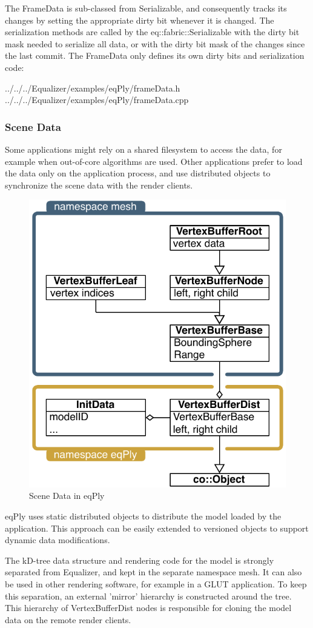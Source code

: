 \documentclass[10pt,a4]{scrartcl}
\begin{document}
The \textsf{FrameData} is sub-classed from \textsf{Serializable}, and
consequently tracks its changes by setting the appropriate dirty bit whenever it
is changed. The serialization methods are called by the
\textsf{eq::fabric::Serializable} with the dirty bit mask needed to serialize
all data, or with the dirty bit mask of the changes since the last
\textsf{commit}. The \textsf{FrameData} only defines its own dirty bits and
serialization code:

{\footnotesize
  {../../../Equalizer/examples/eqPly/frameData.h}}
{\footnotesize
  {../../../Equalizer/examples/eqPly/frameData.cpp}}


\subsubsection{\label{sSceneData}Scene Data}

Some applications might rely on a shared filesystem to access the data,
for example when out-of-core algorithms are used. Other applications
prefer to load the data only on the application process, and use
distributed objects to synchronize the scene data with the render
clients.

\begin{figure}
  \includegraphics[width=.382\textwidth]{images/modelDist.pdf}
  {\caption{\label{fModelDist}Scene Data in eqPly}}
\end{figure}
\textsf{eqPly} uses static distributed objects to distribute the model
loaded by the application. This approach can be easily extended to
versioned objects to support dynamic data modifications.

The kD-tree data structure and rendering code for the model is strongly
separated from Equalizer, and kept in the separate namespace
\textsf{mesh}. It can also be used in other rendering software, for
example in a GLUT application. To keep this separation, an external
'mirror' hierarchy is constructed around the tree. This hierarchy of
\textsf{VertexBufferDist} nodes is responsible for cloning the model
data on the remote render clients.
\end{document}
